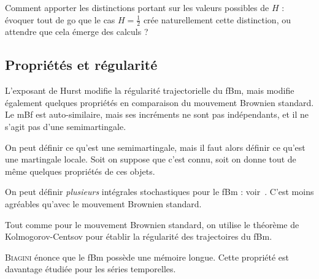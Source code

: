 \begin{question}
  Comment apporter les distinctions portant sur les valeurs possibles
  de $H$ : évoquer tout de go que le cas $H=\frac{1}{2}$ crée
  naturellement cette distinction, ou attendre que cela émerge des
  calculs ?
\end{question}

\subsection{Propriétés et régularité}
L'exposant de Hurst modifie la régularité trajectorielle du fBm, mais
modifie également quelques propriétés en comparaison du mouvement
Brownien standard. Le mBf est auto-similaire, mais ses incréments ne
sont pas indépendants, et il ne s'agit pas d'une semimartingale.

\begin{prerequis}
  On peut définir ce qu'est une semimartingale, mais il faut alors
  définir ce qu'est une martingale locale. Soit on suppose que c'est
  connu, soit on donne tout de même quelques propriétés de ces objets.
\end{prerequis}

On peut définir \emph{plusieurs} intégrales stochastiques pour le fBm
: voir~\cite[Chp.~II-V]{biagini2008}. C'est moins agréables qu'avec le
mouvement Brownien standard.

Tout comme pour le mouvement Brownien standard, on utilise le théorème
de Kolmogorov-Centsov pour établir la régularité des trajectoires du
fBm.

\begin{alert}
  \textsc{Biagini} énonce que le fBm possède une mémoire longue. Cette
  propriété est davantage étudiée pour les séries temporelles.
\end{alert}